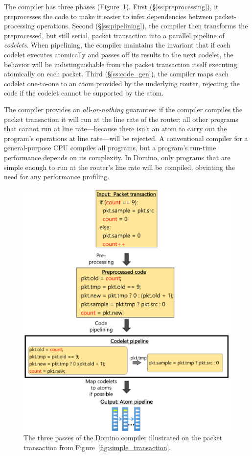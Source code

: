 The compiler has three phases (Figure~\ref{fig:compiler_passes_example}). First
(\S\ref{ss:preprocessing}), it preprocesses the code to make it easier to infer
dependencies between packet-processing operations. Second
(\S\ref{ss:pipelining}), the compiler then transforms the preprocessed, but
still serial, packet transaction into a parallel pipeline of {\em codelets}.
When pipelining, the compiler maintains the invariant that if each codelet
executes atomically and passes off its results to the next codelet, the
behavior will be indistinguishable from the packet transaction itself executing
atomically on each packet. Third (\S\ref{ss:code_gen}), the compiler maps each
codelet one-to-one to an atom provided by the underlying router, rejecting the
code if the codelet cannot be supported by the atom.

The compiler provides an {\em all-or-nothing} guarantee: if the compiler
compiles the packet transaction it will run at the line rate of the router; all
other programs that cannot run at line rate---because there isn't an atom to
carry out the program's operations at line rate---will be rejected. A
conventional compiler for a general-purpose CPU compiles all programs, but a
program's run-time performance depends on its complexity. In Domino, only
programs that are simple enough to run at the router's line rate will be
compiled, obviating the need for any performance profiling.
\begin{figure}[!t]
\includegraphics[width=\textwidth]{compiler_passes_example.pdf}
\caption{The three passes of the Domino compiler illustrated on the packet transaction from Figure~\ref{fig:simple_transaction}.}
\label{fig:compiler_passes_example}
\end{figure}

